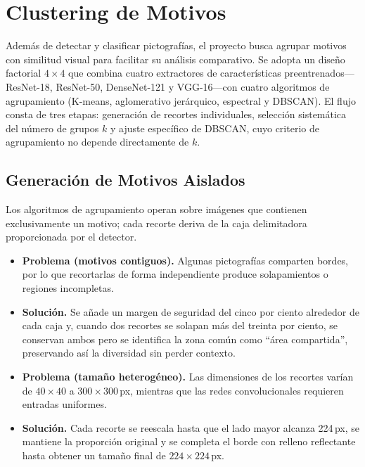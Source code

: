\section{Clustering de Motivos}\label{sec:clustering}

Además de detectar y clasificar pictografías, el proyecto busca agrupar motivos con similitud visual para facilitar su análisis comparativo.
Se adopta un diseño factorial \(4\times4\) que combina cuatro extractores de características preentrenados—ResNet-18, ResNet-50, DenseNet-121 y VGG-16—con cuatro algoritmos de agrupamiento (K-means, aglomerativo jerárquico, espectral y DBSCAN).
El flujo consta de tres etapas: generación de recortes individuales, selección sistemática del número de grupos \(k\) y ajuste específico de DBSCAN, cuyo criterio de agrupamiento no depende directamente de \(k\).

\subsection{Generación de Motivos Aislados}\label{ssec:crop_motifs}

Los algoritmos de agrupamiento operan sobre imágenes que contienen exclusivamente un motivo; cada recorte deriva de la caja delimitadora proporcionada por el detector.

\begin{itemize}
  \item \textbf{Problema (motivos contiguos).}
        Algunas pictografías comparten bordes, por lo que recortarlas de forma independiente produce solapamientos o regiones incompletas.
  \item \textbf{Solución.}
        Se añade un margen de seguridad del cinco por ciento alrededor de cada caja y, cuando dos recortes se solapan más del treinta por ciento, se conservan ambos pero se identifica la zona común como ``área compartida'', preservando así la diversidad sin perder contexto.

  \item \textbf{Problema (tamaño heterogéneo).}
        Las dimensiones de los recortes varían de \(40\times40\) a \(300\times300\)\,px, mientras que las redes convolucionales requieren entradas uniformes.
  \item \textbf{Solución.}
        Cada recorte se reescala hasta que el lado mayor alcanza 224\,px, se mantiene la proporción original y se completa el borde con relleno reflectante hasta obtener un tamaño final de \(224\times224\)\,px.
\end{itemize}


